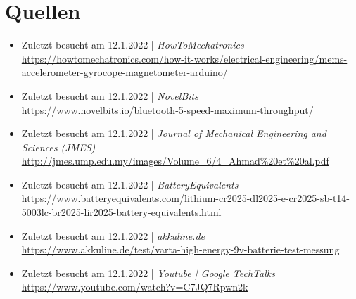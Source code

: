 \chapter{Quellen}
\begin{itemize}
    \item Zuletzt besucht am 12.1.2022 | \textit{HowToMechatronics}\\
        \url{https://howtomechatronics.com/how-it-works/electrical-engineering/mems-accelerometer-gyrocope-magnetometer-arduino/}
    \item Zuletzt besucht am 12.1.2022 | \textit{NovelBits} \\
        \url{https://www.novelbits.io/bluetooth-5-speed-maximum-throughput/}
    \item Zuletzt besucht am 12.1.2022 | \textit{Journal of Mechanical Engineering and Sciences (JMES)} \\
        \url{http://jmes.ump.edu.my/images/Volume_6/4_Ahmad%20et%20al.pdf}
    \item Zuletzt besucht am 12.1.2022 | \textit{BatteryEquivalents}\\
        \url{https://www.batteryequivalents.com/lithium-cr2025-dl2025-e-cr2025-sb-t14-5003lc-br2025-lir2025-battery-equivalents.html}
    \item Zuletzt besucht am 12.1.2022 | \textit{akkuline.de}\\
        \url{https://www.akkuline.de/test/varta-high-energy-9v-batterie-test-messung}
    \item Zuletzt besucht am 12.1.2022 | \textit{Youtube | Google TechTalks} \\
        \url{https://www.youtube.com/watch?v=C7JQ7Rpwn2k}
\end{itemize}